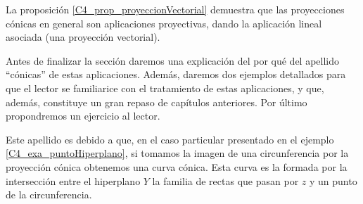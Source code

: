 La proposición \ref*{C4_prop_proyeccionVectorial} demuestra que las proyecciones cónicas en general son aplicaciones proyectivas, dando la aplicación lineal asociada (una proyección vectorial).

Antes de finalizar la sección daremos una explicación del por qué del apellido ``cónicas'' de estas aplicaciones. Además, daremos dos ejemplos detallados para que el lector se familiarice con el tratamiento de estas aplicaciones, y que, además, constituye un gran repaso de capítulos anteriores. Por último propondremos un ejercicio al lector.

\begin{obs}[Cónicas]
	\label{C4_obs_conicas}
	Este apellido es debido a que, en el caso particular presentado en el ejemplo \ref{C4_exa_puntoHiperplano}, si tomamos la imagen de una circunferencia por la proyección cónica obtenemos una curva cónica. Esta curva es la formada por la intersección entre el hiperplano $Y$ la familia de rectas que pasan por $z$ y un punto de la circunferencia.
\end{obs}

